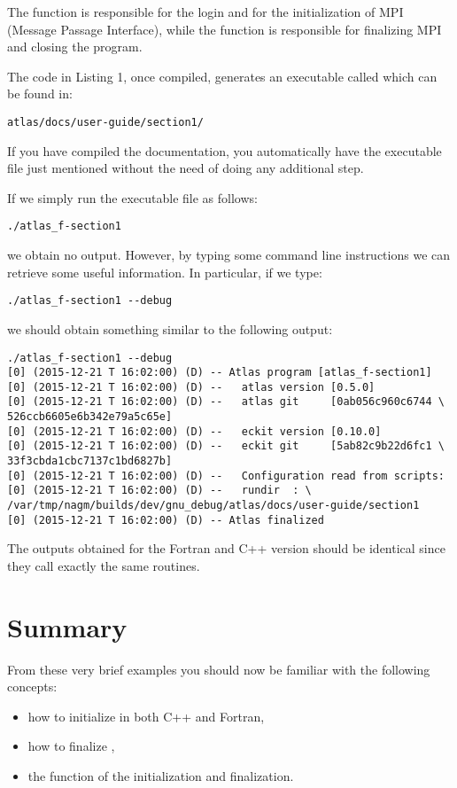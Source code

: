 The function  is responsible for the login 
and for the initialization of MPI (Message Passage Interface), 
while the function  is responsible for
finalizing MPI and closing the program.

The code in Listing 1, once compiled, generates an executable 
called  which can be found in:
%
\begin{lstlisting}[style=BashStyle]
atlas/docs/user-guide/section1/
\end{lstlisting}

% 
\begin{notebox}
If you have compiled the documentation, you automatically have 
the executable file just mentioned without the need of doing 
any additional step.
\end{notebox}
%

If we simply run the executable file as follows:
%
\begin{lstlisting}[style=BashStyle]
./atlas_f-section1
\end{lstlisting}
% 
we obtain no output. 
However, by typing some command line instructions we can 
retrieve some useful information. In particular, if we 
type:
%
\begin{lstlisting}[style=BashStyle]
./atlas_f-section1 --debug
\end{lstlisting}
%
we should obtain something similar to the following output:
%
\begin{lstlisting}[style=BashStyle]
./atlas_f-section1 --debug
[0] (2015-12-21 T 16:02:00) (D) -- Atlas program [atlas_f-section1]
[0] (2015-12-21 T 16:02:00) (D) --   atlas version [0.5.0]
[0] (2015-12-21 T 16:02:00) (D) --   atlas git     [0ab056c960c6744 \
526ccb6605e6b342e79a5c65e]
[0] (2015-12-21 T 16:02:00) (D) --   eckit version [0.10.0]
[0] (2015-12-21 T 16:02:00) (D) --   eckit git     [5ab82c9b22d6fc1 \
33f3cbda1cbc7137c1bd6827b]
[0] (2015-12-21 T 16:02:00) (D) --   Configuration read from scripts:
[0] (2015-12-21 T 16:02:00) (D) --   rundir  : \ 
/var/tmp/nagm/builds/dev/gnu_debug/atlas/docs/user-guide/section1
[0] (2015-12-21 T 16:02:00) (D) -- Atlas finalized
\end{lstlisting}
%

\begin{tipbox}
The outputs obtained for the Fortran and C++ version should be identical
since they call exactly the same routines. 
\end{tipbox}



\section{Summary}
From these very brief examples you should now be familiar 
with the following concepts: 
\begin{itemize}
\item how to initialize \Atlas in both C++ and Fortran,
\item how to finalize \Atlas,
\item the function of the \Atlas initialization and finalization.
\end{itemize}

